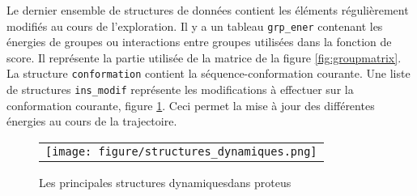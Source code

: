 Le dernier ensemble de structures de données contient les éléments régulièrement modifiés au cours de l'exploration.
Il y a un tableau  \verb!grp_ener! contenant les énergies de groupes ou interactions entre groupes utilisées dans la fonction de score. Il représente la partie utilisée de la matrice de la figure \ref{fig:groupmatrix}. La structure \verb!conformation! contient la séquence-conformation courante. Une liste de structures \verb!ins_modif! représente les modifications à effectuer sur la conformation courante, figure \ref{fig:structDyna}. Ceci permet la mise à jour des différentes énergies au cours de la trajectoire.   

   \begin{figure}[!htbp]
     \centering
     \begin{tabular}{c}
       \texttt{[image: figure/structures\_dynamiques.png]} 
     \end{tabular}
     
     \caption{Les principales structures \og dynamiques\fg dans proteus}
\label{fig:structDyna}
   \end{figure}




